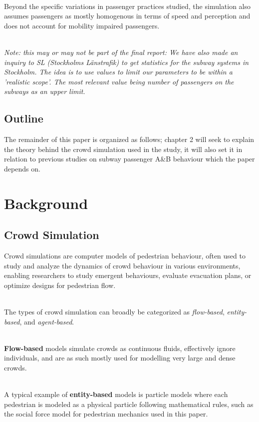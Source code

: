\documentclass{kththesis}
\begin{document}
\noindent
\\
Beyond the specific variations in passenger practices studied, the simulation also assumes passengers as mostly homogenous in terms of speed and perception and does not account for mobility impaired passengers.

\noindent
\\
\textit{Note: this may or may not be part of the final report: We have also made an inquiry to SL (Stockholms Länstrafik) to get statistics for the subway systems in Stockholm. The idea is to use values to limit our parameters to be within a 'realistic scope'. The most relevant value being number of passengers on the subways as an upper limit.}

\section{Outline}
The remainder of this paper is organized as follows; chapter 2 will seek to explain the theory behind the crowd simulation used in the study, it will also set it in relation to previous studies on subway passenger A\&B behaviour which the paper depends on. 

\chapter{Background}
\section{Crowd Simulation}
Crowd simulations are computer models of pedestrian behaviour, often used to study and analyze the dynamics of crowd behaviour in various environments, enabling researchers to study emergent behaviours, evaluate evacuation plans, or optimize designs for pedestrian flow. \parencite{zhou2010}

\noindent
\\
The types of crowd simulation can broadly be categorized as \textit{flow-based}, \textit{entity-based}, and \textit{agent-based}. \parencite{zhou2010}

\noindent
\\
\textbf{Flow-based} models simulate crowds as continuous fluids, effectively ignore individuals, and are as such mostly used for modelling very large and dense crowds.

\noindent
\\
A typical example of \textbf{entity-based} models is particle models where each pedestrian is modeled as a physical particle following mathematical rules, such as the social force model for pedestrian mechanics used in this paper.
\end{document}
